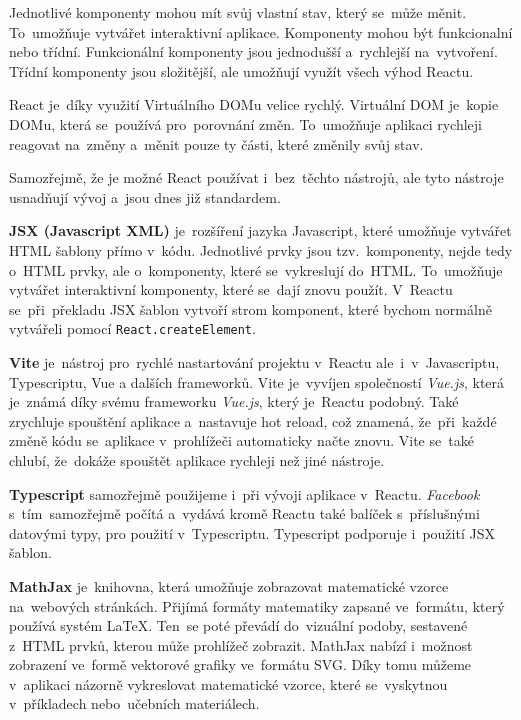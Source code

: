 \documentclass[14pt,a4paper]{article}
\begin{document}
            Jednotlivé komponenty mohou mít svůj vlastní stav, který se~může měnit. To~umožňuje vytvářet interaktivní aplikace.
            Komponenty mohou být funkcionalní nebo třídní. Funkcionální komponenty jsou jednodušší a~rychlejší na~vytvoření.
            Třídní komponenty jsou složitější, ale umožňují využít všech výhod Reactu.

            React je~díky využití Virtuálního DOMu velice rychlý. Virtuální DOM je~kopie DOMu, která se~používá pro~porovnání změn.
            To~umožňuje aplikaci rychleji reagovat na~změny a~měnit pouze ty části, které změnily svůj stav.

            Samozřejmě, že je možné React používat i~bez~těchto nástrojů, ale tyto nástroje usnadňují vývoj a~jsou dnes již standardem. \parencite{elrom2021react}
            
            \textbf{JSX (Javascript XML)} je~rozšíření jazyka Javascript, které umožňuje vytvářet HTML šablony přímo v~kódu. Jednotlivé prvky jsou tzv.~komponenty,
            nejde tedy o~HTML prvky, ale o~komponenty, které se~vykreslují do~HTML. To~umožňuje vytvářet interaktivní komponenty, které se~dají znovu použít.
            V~Reactu se~při~překladu JSX šablon vytvoří strom komponent, které bychom normálně vytvářeli pomocí \texttt{React.createElement}.

            \textbf{Vite} je~nástroj pro~rychlé nastartování projektu v~Reactu ale~i~v~Javascriptu, Typescriptu, Vue a dalších frameworků.
            Vite je~vyvíjen společností \emph{Vue.js}, která je~známá díky svému frameworku \emph{Vue.js}, který je~Reactu podobný.
            Také zrychluje spouštění aplikace a~nastavuje hot reload, což znamená, že~při~každé změně kódu se~aplikace v~prohlížeči automaticky načte znovu.
            Vite se~také chlubí, že~dokáže spouštět aplikace rychleji než jiné nástroje.\parencite{vitejs}

            \textbf{Typescript} samozřejmě použijeme i~při vývoji aplikace v~Reactu. \emph{Facebook} s~tím~samozřejmě počítá a~vydává
            kromě Reactu také balíček s~příslušnými datovými typy, pro použití v~Typescriptu. Typescript podporuje i~použití JSX šablon. \parencite[Refeerence/Handbook/JSX]{TypeScript}

            \textbf{MathJax} je~knihovna, která umožňuje zobrazovat matematické vzorce na~webových stránkách.
            Přijímá formáty matematiky zapsané ve~formátu, který používá systém \LaTeX. Ten~se poté převádí do~vizuální podoby, sestavené z~HTML prvků, kterou může prohlížeč zobrazit.
            MathJax nabízí i~možnost zobrazení ve~formě vektorové grafiky ve~formátu SVG.
            Díky tomu můžeme v~aplikaci názorně vykreslovat matematické vzorce, které se~vyskytnou v~příkladech nebo~učebních materiálech.
\end{document}
